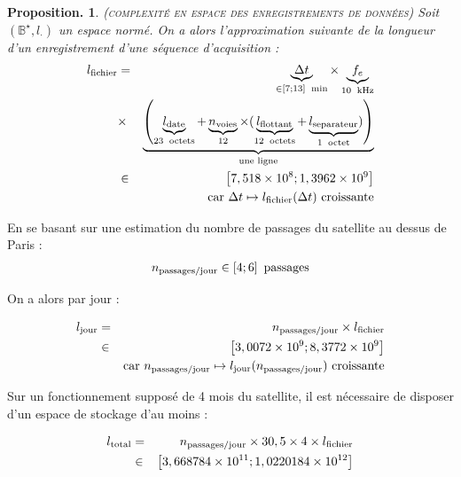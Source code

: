 \documentclass[twocolumn,pre,floats,aps,amsmath,amssymb]{revtex4}
\newtheorem{proposition}[theorem]{Proposition.}
\begin{document}
\begin{proposition}
  (\textsc{complexit\'e en espace des enregistrements de donn\'ees})
  Soit $(\mathbb{B}^{\star}, l_{\cdot})$ un espace norm\'e. On a alors l'approximation suivante de la longueur d'un enregistrement d'une s\'equence d'acquisition :
  \begin{eqnarray}
    l_{\textup{fichier}} &=& \underbrace{\Delta t}_{\in \left [ 7 ; 13 \right ] \ \operatorname{min}} \times \underbrace{f_e}_{10 \ \operatorname{kHz}} \nonumber\\
                    &\times& \underbrace{\left (\underbrace{l_{\textup{date}}}_{23 \ \operatorname{octets}} + \underbrace{n_{\textup{voies}}}_{12} \times (\underbrace{l_{\textup{flottant}}}_{12 \ \operatorname{octets}} + \underbrace{l_{\textup{separateur}}}_{1 \ \operatorname{octet}} ) \right )}_{\textup{une ligne}}\\
                    &\in& \left [ 7,518 \times 10^8 ; 1,3962 \times 10^9 \right ] \\
                    &\ &  \textup{car } \Delta t \mapsto l_{\textup{fichier}} (\Delta t) \ \textup{croissante} \nonumber
  \end{eqnarray}
\end{proposition}

En se basant sur une estimation du nombre de passages du satellite au dessus de Paris\cite{IPGP_simul_loic} :
\begin{eqnarray}
  n_{\textup{passages/jour}} \in \left [ 4 ; 6 \right ] \ \textup{passages}
\end{eqnarray}

On a alors par jour :

\begin{eqnarray}
  l_{\textup{jour}} &=& n_{\textup{passages/jour}} \times l_{\textup{fichier}}\\
                &\in& \left [ 3,0072 \times 10^9 ; 8,3772 \times 10^9 \right ] \\
                &\ & \textup{car } n_{\textup{passages/jour}} \mapsto l_{\textup{jour}} (n_{\textup{passages/jour}}) \ \textup{croissante} \nonumber
\end{eqnarray}

Sur un fonctionnement suppos\'e de 4 mois\cite{IITB_general} du satellite, il est n\'ecessaire de disposer d'un espace de stockage d'au moins :

\begin{eqnarray}
  l_{\textup{total}} &=& n_{\textup{passages/jour}} \times 30,5 \times 4 \times l_{\textup{fichier}}\\
                 &\in& \left [ 3,668784 \times 10^{11} ; 1,0220184 \times 10^{12} \right ]
\end{eqnarray}
\end{document}
